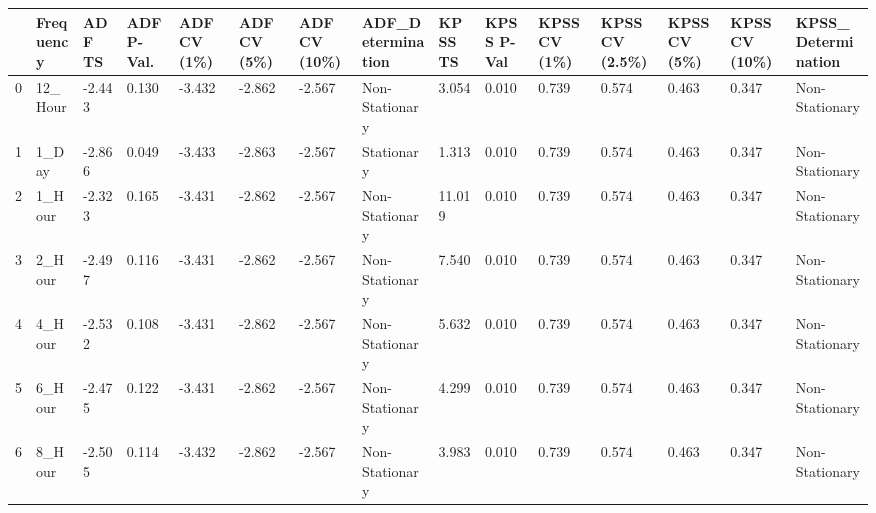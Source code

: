 \begin{tabular}{lllllllllllllll}
\toprule
 & Frequency & ADF TS & ADF P-Val. & ADF CV (1\%) & ADF CV (5\%) & ADF CV (10\%) & ADF_Determination & KPSS TS & KPSS P-Val & KPSS CV (1\%) & KPSS CV (2.5\%) & KPSS CV (5\%) & KPSS CV (10\%) & KPSS_Determination \\
\midrule
0 & 12_Hour & -2.443 & 0.130 & -3.432 & -2.862 & -2.567 & Non-Stationary & 3.054 & 0.010 & 0.739 & 0.574 & 0.463 & 0.347 & Non-Stationary \\
1 & 1_Day & -2.866 & 0.049 & -3.433 & -2.863 & -2.567 & Stationary & 1.313 & 0.010 & 0.739 & 0.574 & 0.463 & 0.347 & Non-Stationary \\
2 & 1_Hour & -2.323 & 0.165 & -3.431 & -2.862 & -2.567 & Non-Stationary & 11.019 & 0.010 & 0.739 & 0.574 & 0.463 & 0.347 & Non-Stationary \\
3 & 2_Hour & -2.497 & 0.116 & -3.431 & -2.862 & -2.567 & Non-Stationary & 7.540 & 0.010 & 0.739 & 0.574 & 0.463 & 0.347 & Non-Stationary \\
4 & 4_Hour & -2.532 & 0.108 & -3.431 & -2.862 & -2.567 & Non-Stationary & 5.632 & 0.010 & 0.739 & 0.574 & 0.463 & 0.347 & Non-Stationary \\
5 & 6_Hour & -2.475 & 0.122 & -3.431 & -2.862 & -2.567 & Non-Stationary & 4.299 & 0.010 & 0.739 & 0.574 & 0.463 & 0.347 & Non-Stationary \\
6 & 8_Hour & -2.505 & 0.114 & -3.432 & -2.862 & -2.567 & Non-Stationary & 3.983 & 0.010 & 0.739 & 0.574 & 0.463 & 0.347 & Non-Stationary \\
\bottomrule
\end{tabular}
